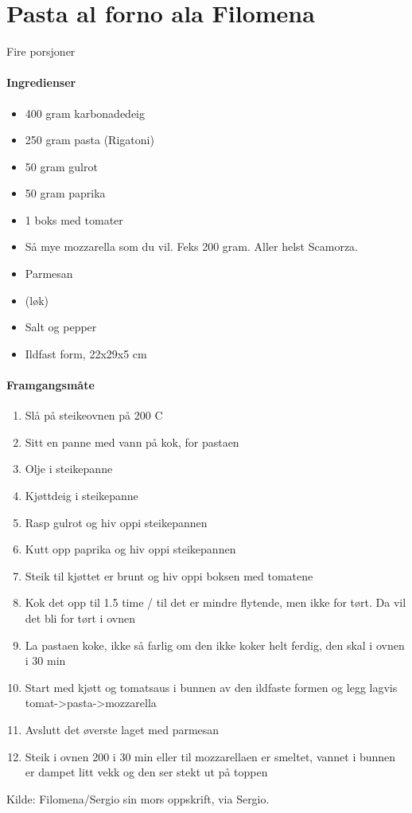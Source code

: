 \section{﻿Pasta al forno ala Filomena}

Fire porsjoner

\paragraph{Ingredienser}
\begin{itemize}[noitemsep]
	\item 400 gram karbonadedeig
	\item 250 gram pasta (Rigatoni)
	\item 50 gram gulrot
	\item 50 gram paprika
	\item 1 boks med tomater
	\item Så mye mozzarella som du vil. Feks 200 gram. Aller helst Scamorza.
	\item Parmesan
	\item (løk)
	\item Salt og pepper
	\item Ildfast form, 22x29x5 cm
\end{itemize}

\paragraph{Framgangsmåte}
\begin{enumerate}[noitemsep]
	\item Slå på steikeovnen på 200 \degree C
	\item Sitt en panne med vann på kok, for pastaen
	\item Olje i steikepanne
	\item Kjøttdeig i steikepanne
	\item Rasp gulrot og hiv oppi steikepannen
	\item Kutt opp paprika og hiv oppi steikepannen
	\item Steik til kjøttet er brunt og hiv oppi boksen med tomatene
	\item Kok det opp til 1.5 time / til det er mindre flytende, men ikke for tørt. Da vil det bli for tørt i ovnen
	\item La pastaen koke, ikke så farlig om den ikke koker helt ferdig, den skal i ovnen i 30 min
	\item Start med kjøtt og tomatsaus i bunnen av den ildfaste formen og legg lagvis tomat->pasta->mozzarella
	\item Avslutt det øverste laget med parmesan
	\item Steik i ovnen 200 i 30 min eller til mozzarellaen er smeltet, vannet i bunnen er dampet litt vekk og den ser stekt ut på toppen
\end{enumerate}


Kilde: Filomena/Sergio sin mors oppskrift, via Sergio.
